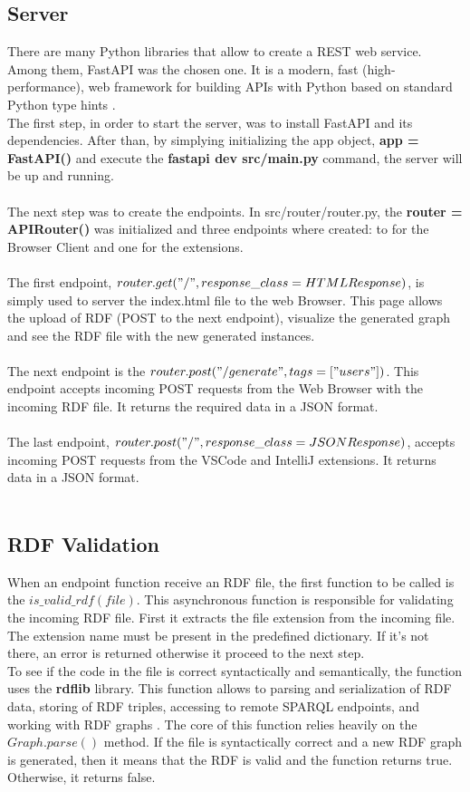 \subsection{Server} 
There are many Python libraries that allow to create a REST web service. Among them, FastAPI was the chosen one. It is a modern, fast (high-performance), web framework for building APIs with Python based on standard Python type hints \cite{fastapi}.
\\
The first step, in order to start the server, was to install FastAPI and its dependencies. After than, by simplying initializing the app object, \textbf{app = FastAPI()} and execute the \textbf{fastapi dev src/main.py} command, the server will be up and running. 
\\
\\
The next step was to create the endpoints. In src/router/router.py, the \textbf{router = APIRouter()} was initialized and three endpoints where created: to for the Browser Client and one for the extensions.
\\
\\
The first endpoint, \textbf{$router.get("/", response\_class=HTMLResponse)$}, is simply used to server the index.html file to the web Browser. This page allows the upload of RDF (POST to the next endpoint), visualize the generated graph and see the RDF file with the new generated instances.
\\
\\
The next endpoint is the \textbf{$router.post("/generate", tags=["users"])$}. This endpoint accepts incoming POST requests from the Web Browser with the incoming RDF file. It returns the required data in a JSON format.
\\
\\
The last endpoint, \textbf{$router.post("/", response\_class=JSONResponse)$}, accepts incoming POST requests from the VSCode and IntelliJ extensions. It returns data in a JSON format.
\\
\\
\subsection{RDF Validation} 
When an endpoint function receive an RDF file, the first function to be called is the \textbf{$is\_valid\_rdf(file)$}. This asynchronous function is responsible for validating the incoming RDF file. First it extracts the file extension from the incoming file. The extension name must be present in the predefined dictionary. If it's not there, an error is returned otherwise it proceed to the next step.
\\
To see if the code in the file is correct syntactically and semantically, the function uses the \textbf{rdflib} library. This function allows to parsing and serialization of RDF data, storing of RDF triples, accessing to remote SPARQL endpoints, and working with RDF graphs \cite{rdflib}.
The core of this function relies heavily on the $Graph.parse()$ method. If the file is syntactically correct and a new RDF graph is generated, then it means that the RDF is valid and the function returns true. Otherwise, it returns false.
